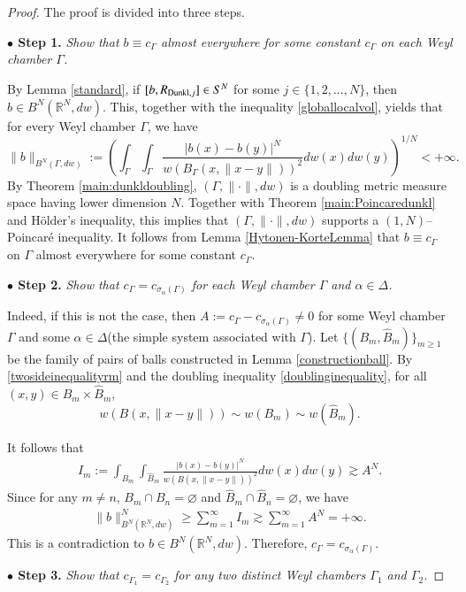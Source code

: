\documentclass[12pt]{amsart}
\begin{document}
\begin{proof}
The proof is divided into three steps.

{\bf $\bullet$ Step 1.} {\it Show that $b\equiv c_{\Gamma}$ almost everywhere for some constant $c_\Gamma$ on each Weyl chamber $\Gamma$.}

By Lemma \ref{standard}, if $[b,R_{{\rm Dunkl},j}]\in S^N$ for some $j\in\{1,2,...,N\}$, then $b\in B^N(\mathbb{R}^N,dw)$. This, together with the inequality \eqref{globallocalvol}, yields that for every Weyl chamber $\Gamma$, we have
$$\|b\|_{B^N(\Gamma,dw)}:=\left(\int_{\Gamma}\int_{\Gamma}\frac{|b(x)-b(y)|^N}{w(B_\Gamma(x,\|x-y\|))^2}dw(x)dw(y)\right)^{1/N}<+\infty.$$
By Theorem \ref{main:dunkldoubling}, $(\Gamma,\|\cdot\|,dw)$ is a doubling metric measure space having lower dimension $N$.
Together with Theorem \ref{main:Poincaredunkl} and H\"{o}lder's inequality, this implies that $(\Gamma,\|\cdot\|,dw)$ supports a $(1,N)$--Poincar\'e inequality. It follows from Lemma \ref{Hytonen-KorteLemma} that $b\equiv c_{\Gamma}$ on $\Gamma$ almost everywhere for some constant $c_\Gamma$.

{\bf $\bullet$ Step 2.} {\it Show that $c_{\Gamma}=c_{\sigma_\alpha(\Gamma)}$ for each Weyl chamber $\Gamma$ and $\alpha\in \Delta$.}

Indeed, if this is not the case, then $A:=c_{\Gamma}-c_{\sigma_\alpha(\Gamma)}\neq 0$ for some Weyl chamber $\Gamma$ and some $\alpha\in \Delta$(the simple system associated with $\Gamma$). Let $\{(B_m,\hat{B}_m)\}_{m\geq 1}$ be the family of pairs of balls constructed in Lemma \ref{constructionball}. By \eqref{twosideinequalityrm} and the doubling inequality \eqref{doublinginequality}, for all $(x,y)\in B_m\times \hat{B}_m$,
$$w(B(x,\|x-y\|))\sim w(B_m)\sim w(\hat{B}_m).$$


It follows that
\begin{align*}
I_m:=\int_{B_m}\int_{\hat{B}_m}\frac{|b(x)-b(y)|^N}{w(B(x,\|x-y\|))^2}dw(x)dw(y)\gtrsim A^N.
\end{align*}
Since for any $m \neq n$, $B_m \cap B_n = \varnothing$ and $\hat{B}_m \cap \hat{B}_n = \varnothing$, we have
\begin{align*}
\|b\|_{B^N(\mathbb{R}^N,dw)}^N\geq \sum_{m=1}^\infty I_m \gtrsim \sum_{m=1}^\infty A^N=+\infty.
\end{align*}
This is a contradiction to $b\in B^N(\mathbb{R}^N,dw)$. Therefore, $c_{\Gamma}=c_{\sigma_\alpha(\Gamma)}$.

{\bf $\bullet$ Step 3.} {\it Show that $c_{\Gamma_1}=c_{\Gamma_2}$ for any two distinct Weyl chambers $\Gamma_1$ and $\Gamma_2$.}


\end{proof}
\end{document}
